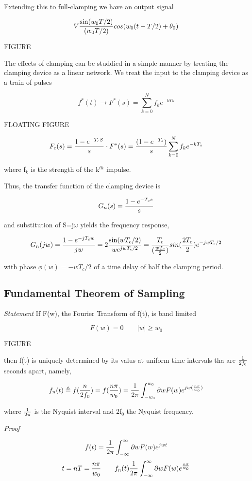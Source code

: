 \documentclass[11pt,fleqn]{book} %
\begin{document}
Extending this to full-clamping we have an output signal

$$V{\sin(w_0T/2)\over (w_0T/2)}cos(w_0(t-T/2)+\theta_0)$$

FIGURE

The effects of clamping can be studdied in a simple manner by treating the clamping device as a linear network. We treat the input to the clamping device as a train of pulses

$$f^*(t)\to F^*(s)=\sum_{k=0}^Nf_k e^{-kTs}$$

FLOATING FIGURE

$$F_c(s)={1-e^{-T_cS}\over s}\cdot F^*(s)={(1-e^{-T_s})\over s}\sum_{k=0}^Nf_k e^{-kT_s}$$

where f$_k$ is the strength of the k$^{th}$ impulse.

Thus, the transfer function of the clamping device is

$$G_n(s)={1-e^{-T_cs}\over s}$$

and substitution of S=j$\omega$ yields the frequency response,

$$G_n(jw)={1-e^{-jT_cw}\over jw}=2{\sin(wT_c/2)\over w e^{jwT_c/2}}={T_c\over ({wT_c\over 2})}sin({2T_c\over 2})e^{-jwT_c/2}$$

with phase $\phi(w)=-wT_c/2$ of a time delay of half the clamping period.

\subsection{Fundamental Theorem of Sampling}

\textit{Statement}
If F(w), the Fourier Transform of f(t), is band limited

$$F(w)=0 \qquad |w|\geq w_0$$

FIGURE

then f(t) is uniquely determined by its valus at uniform time intervals tha are ${1\over 2f_0}$ seconds apart, namely,

$$f_n(t)\triangleq f({n\over 2f_0})=f({n\pi\over w_0})={1\over 2\pi}\int_{-w_0}^{w_0}\partial wF(w)e^{jw({n\pi\over w_0})}$$

where ${1\over 2\pi}$ is the Nyquist interval and 2f$_0$ the Nyquist frequency.

\textit{Proof}

$$f(t)={1\over 2\pi}\int_{-\infty}^\infty\partial wF(w)e^{jwt}$$
$$t=nT={n\pi\over w_0}\qquad f_n(t){1\over 2\pi}\int_{-\infty}^\infty\partial wF(w)e^{n\pi\over w_0}$$
\end{document}

